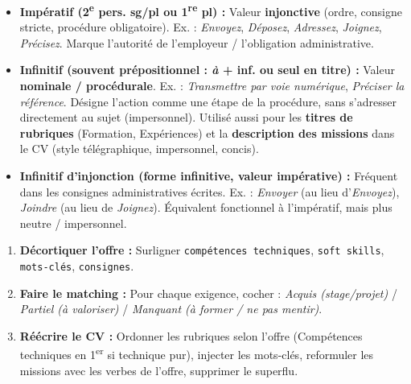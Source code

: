 \documentclass[11pt]{article}
\begin{document}
\begin{propriete}
\begin{itemize}
    \item \textbf{Impératif (2\textsuperscript{e} pers. sg/pl ou 1\textsuperscript{re} pl) :} Valeur \textbf{injonctive} (ordre, consigne stricte, procédure obligatoire). Ex. : \emph{Envoyez}, \emph{Déposez}, \emph{Adressez}, \emph{Joignez}, \emph{Précisez}. Marque l'autorité de l'employeur / l'obligation administrative.
    \item \textbf{Infinitif (souvent prépositionnel : \emph{à} + inf. ou seul en titre) :} Valeur \textbf{nominale / procédurale}. Ex. : \emph{Transmettre par voie numérique}, \emph{Préciser la référence}. Désigne l'action comme une étape de la procédure, sans s'adresser directement au sujet (impersonnel). Utilisé aussi pour les \textbf{titres de rubriques} (Formation, Expériences) et la \textbf{description des missions} dans le CV (style télégraphique, impersonnel, concis).
    \item \textbf{Infinitif d'injonction (forme infinitive, valeur impérative) :} Fréquent dans les consignes administratives écrites. Ex. : \emph{Envoyer} (au lieu d'\emph{Envoyez}), \emph{Joindre} (au lieu de \emph{Joignez}). Équivalent fonctionnel à l'impératif, mais plus neutre / impersonnel.
\end{itemize}
\end{propriete}

\begin{methode}
\begin{enumerate}
    \item \textbf{Décortiquer l'offre :} Surligner \texttt{\textcolor{popblue}{compétences techniques}}, \texttt{\textcolor{poporange}{soft skills}}, \texttt{\textcolor{popgreen}{mots-clés}}, \texttt{\textcolor{poppink}{consignes}}.
    \item \textbf{Faire le matching :} Pour chaque exigence, cocher : \emph{Acquis (stage/projet)} / \emph{Partiel (à valoriser)} / \emph{Manquant (à former / ne pas mentir)}.
    \item \textbf{Réécrire le CV :} Ordonner les rubriques selon l'offre (Compétences techniques en 1\textsuperscript{er} si technique pur), injecter les mots-clés, reformuler les missions avec les verbes de l'offre, supprimer le superflu.
\end{enumerate}
\end{methode}
\end{document}
